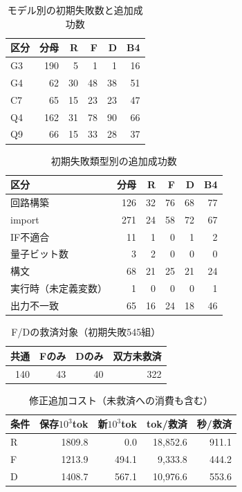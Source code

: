 \begin{table}[tb]
\centering
\caption{モデル別の初期失敗数と追加成功数}
\label{tab:model}
\begin{tabular}{lrrrrr}
\hline
区分 & 分母 & R & F & D & B4 \\
\hline
G3 & 190 & 5 & 1 & 1 & 16 \\
G4 & 62 & 30 & 48 & 38 & 51 \\
C7 & 65 & 15 & 23 & 23 & 47 \\
Q4 & 162 & 31 & 78 & 90 & 66 \\
Q9 & 66 & 15 & 33 & 28 & 37 \\
\hline
\end{tabular}
\end{table}

\begin{table}[tb]
\centering
\caption{初期失敗類型別の追加成功数}
\label{tab:error}
\begin{tabular}{lrrrrr}
\hline
区分 & 分母 & R & F & D & B4 \\
\hline
回路構築 & 126 & 32 & 76 & 68 & 77 \\
import & 271 & 24 & 58 & 72 & 67 \\
IF不適合 & 11 & 1 & 0 & 1 & 2 \\
量子ビット数 & 3 & 2 & 0 & 0 & 0 \\
構文 & 68 & 21 & 25 & 21 & 24 \\
実行時（未定義変数） & 1 & 0 & 0 & 0 & 1 \\
出力不一致 & 65 & 16 & 24 & 18 & 46 \\
\hline
\end{tabular}
\end{table}

\begin{table}[tb]
\centering
\caption{F/Dの救済対象（初期失敗545組）}
\label{tab:overlap}
\begin{tabular}{rrrr}
\hline
共通 & Fのみ & Dのみ & 双方未救済 \\
\hline
140 & 43 & 40 & 322 \\
\hline
\end{tabular}
\end{table}

\begin{table}[tb]
\centering
\caption{修正追加コスト（未救済への消費も含む）}
\label{tab:cost}
\begin{tabular}{lrrrr}
\hline
条件 & 保存$10^3$tok & 新$10^3$tok & tok/救済 & 秒/救済 \\
\hline
R & 1809.8 & 0.0 & 18,852.6 & 911.1 \\
F & 1213.9 & 494.1 & 9,333.8 & 444.2 \\
D & 1408.7 & 567.1 & 10,976.6 & 553.6 \\
\hline
\end{tabular}
\end{table}

